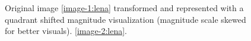 \begin{figure}[htbp]
	\centering
    \hfill
	\caption{Original image \ref{image-1:lena} transformed and represented with a quadrant shifted magnitude visualization (magnitude scale skewed for better visuals). \ref{image-2:lena}. }
    \label{fig:twodimentransform}
\end{figure}


